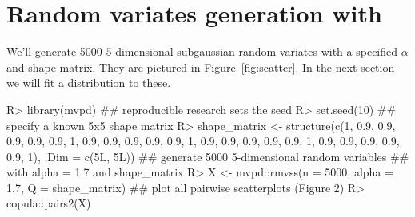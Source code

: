


\section{Random variates generation with }

We'll generate 5000 $5$-dimensional subgaussian random variates with a
specified $\alpha$ and shape matrix. They are pictured in
Figure~\ref{fig:scatter}. In the next section we will fit a
distribution to these.

\begin{example}
  R> library(mvpd)
  ## reproducible research sets the seed
  R> set.seed(10)
  ## specify a known 5x5 shape matrix
  R> shape_matrix <- structure(c(1, 0.9, 0.9, 0.9, 0.9,
                                 0.9, 1, 0.9, 0.9, 0.9,
                                 0.9, 0.9, 1, 0.9, 0.9,
                                 0.9, 0.9, 0.9, 1, 0.9,
                                 0.9, 0.9, 0.9, 0.9, 1),
                                 .Dim = c(5L, 5L))
  ## generate 5000 5-dimensional random variables
  ## with alpha = 1.7 and shape_matrix                               
  R> X <- mvpd::rmvss(n = 5000, alpha = 1.7, Q = shape_matrix)
  ## plot all pairwise scatterplots (Figure 2)                            
  R> copula::pairs2(X)
\end{example}

